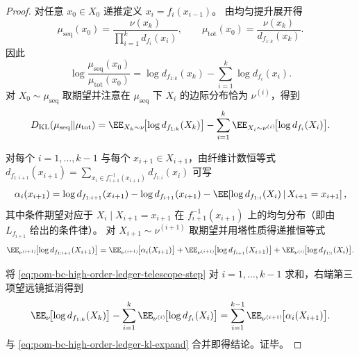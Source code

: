 \begin{proof}
对任意 \(x_0\in X_0\) 递推定义 \(x_i=f_i(x_{i-1})\)。
由均匀提升展开得
\[
\mu_{\mathrm{seq}}(x_0)=\frac{\nu(x_k)}{\prod_{i=1}^{k}d_{f_i}(x_i)},
\qquad
\mu_{\mathrm{tot}}(x_0)=\frac{\nu(x_k)}{d_{f_{1:k}}(x_k)}.
\]
因此
\[
\log\frac{\mu_{\mathrm{seq}}(x_0)}{\mu_{\mathrm{tot}}(x_0)}
=
\log d_{f_{1:k}}(x_k)-\sum_{i=1}^{k}\log d_{f_i}(x_i).
\]
对 \(X_0\sim \mu_{\mathrm{seq}}\) 取期望并注意在 \(\mu_{\mathrm{seq}}\) 下 \(X_i\) 的边际分布恰为 \(\nu^{(i)}\)，得到
\begin{equation}\label{eq:pom-bc-high-order-ledger-kl-expand}
D_{\mathrm{KL}}(\mu_{\mathrm{seq}}\|\mu_{\mathrm{tot}})
=\EE_{X_k\sim\nu}\!\bigl[\log d_{f_{1:k}}(X_k)\bigr]
-\sum_{i=1}^{k}\EE_{X_i\sim\nu^{(i)}}\!\bigl[\log d_{f_i}(X_i)\bigr].
\end{equation}
\par
对每个 \(i=1,\dots,k-1\) 与每个 \(x_{i+1}\in X_{i+1}\)，由纤维计数恒等式
\(
d_{f_{1:i+1}}(x_{i+1})=\sum_{x_i\in f_{i+1}^{-1}(x_{i+1})}d_{f_{1:i}}(x_i)
\)
可写
\[
\alpha_i(x_{i+1})
=\log d_{f_{1:i+1}}(x_{i+1})-\log d_{f_{i+1}}(x_{i+1})
-\EE\!\left[\log d_{f_{1:i}}(X_i)\,\middle|\,X_{i+1}=x_{i+1}\right],
\]
其中条件期望对应于 \(X_i\mid X_{i+1}=x_{i+1}\) 在 \(f_{i+1}^{-1}(x_{i+1})\) 上的均匀分布（即由 \(L_{f_{i+1}}\) 给出的条件律）。
对 \(X_{i+1}\sim \nu^{(i+1)}\) 取期望并用塔性质得递推恒等式
\begin{equation}\label{eq:pom-bc-high-order-ledger-telescope-step}
\EE_{\nu^{(i+1)}}\!\bigl[\log d_{f_{1:i+1}}(X_{i+1})\bigr]
=\EE_{\nu^{(i+1)}}\!\bigl[\alpha_i(X_{i+1})\bigr]
+\EE_{\nu^{(i+1)}}\!\bigl[\log d_{f_{i+1}}(X_{i+1})\bigr]
+\EE_{\nu^{(i)}}\!\bigl[\log d_{f_{1:i}}(X_i)\bigr].
\end{equation}
\par
将 \eqref{eq:pom-bc-high-order-ledger-telescope-step} 对 \(i=1,\dots,k-1\) 求和，右端第三项望远镜抵消得到
\[
\EE_{\nu}\!\bigl[\log d_{f_{1:k}}(X_k)\bigr]
-\sum_{i=1}^{k}\EE_{\nu^{(i)}}\!\bigl[\log d_{f_i}(X_i)\bigr]
=\sum_{i=1}^{k-1}\EE_{\nu^{(i+1)}}\!\bigl[\alpha_i(X_{i+1})\bigr].
\]
与 \eqref{eq:pom-bc-high-order-ledger-kl-expand} 合并即得结论。证毕。
\end{proof}

